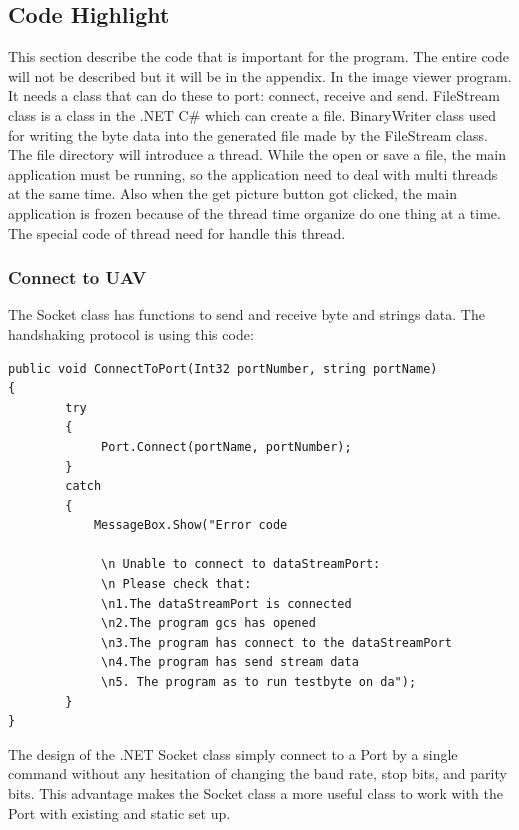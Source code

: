 \documentclass[oneside]{ecsgdp}         %
\begin{document}
\subsection{Code Highlight}

This section describe the code that is important for the program. The entire code will not be described but it will be in the appendix. In the image viewer program. It needs a class that can do these to port: connect, receive and send. FileStream class is a class in the .NET C\# which can create a file. BinaryWriter class used for writing the byte data into the generated file made by the FileStream class. The file directory will introduce a thread. While the open or save a file, the main application must be running, so the application need to deal with multi threads at the same time. Also when the get picture button got clicked, the main application is frozen because of the thread time organize do one thing at a time. The special code of thread need for handle this thread. 

\subsubsection*{Connect to UAV}
The Socket class has functions to send and receive byte and strings data. The handshaking protocol is using this code:

\begin{lstlisting}[caption={connect to port},label=lst:connectT]
public void ConnectToPort(Int32 portNumber, string portName)
{
        try            
        {
             Port.Connect(portName, portNumber);                
        }            
        catch 
        {            
            MessageBox.Show("Error code
                
             \n Unable to connect to dataStreamPort:
             \n Please check that:                
             \n1.The dataStreamPort is connected                 
             \n2.The program gcs has opened                 
             \n3.The program has connect to the dataStreamPort                
             \n4.The program has send stream data                
             \n5. The program as to run testbyte on da");                
        }            
}
        \end{lstlisting}

        
	The design of the .NET Socket class simply connect to a Port by a single command without any hesitation of changing the baud rate, stop bits, and parity bits. This advantage makes the Socket class a more useful class to work with the Port with existing and static set up. 
\end{document}
